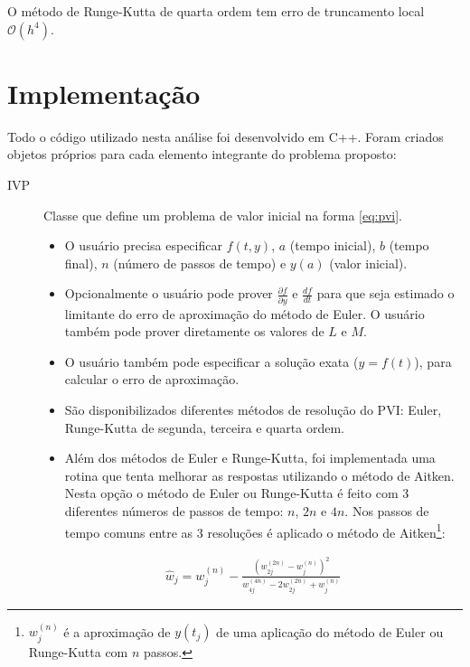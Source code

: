 \documentclass[final,5p]{elsarticle}
\numberwithin{equation}{section}
\begin{document}
        O método de Runge-Kutta de quarta ordem tem erro de truncamento local $\mathcal{O}(h^4)$.

\section{Implementação} \label{sec:implementacao}

        Todo o código utilizado nesta análise foi desenvolvido em C++. Foram criados objetos próprios para cada elemento integrante do problema proposto:

        \begin{description}
            \item[IVP] Classe que define um problema de valor inicial na forma \ref{eq:pvi}.
            \begin{itemize}
                \item O usuário precisa especificar $f(t,y)$, $a$ (tempo inicial), $b$ (tempo final), $n$ (número de passos de tempo) e $y(a)$ (valor inicial).
                \item Opcionalmente o usuário pode prover $\frac{\partial f}{\partial y}$ e $\frac{df}{dt}$ para que seja estimado o limitante do erro de aproximação do método de Euler. O usuário também pode prover diretamente os valores de $L$ e $M$.
                \item O usuário também pode especificar a solução exata ($y=f(t)$), para calcular o erro de aproximação.
                \item São disponibilizados diferentes métodos de resolução do PVI: Euler, Runge-Kutta de segunda, terceira e quarta ordem.
                \item Além dos métodos de Euler e Runge-Kutta, foi implementada uma rotina que tenta melhorar as respostas utilizando o método de Aitken. Nesta opção o método de Euler ou Runge-Kutta é feito com 3 diferentes números de passos de tempo: $n$, $2 n$ e $4 n$. Nos passos de tempo comuns entre as 3 resoluções é aplicado o método de Aitken\footnote{$w^{(n)}_j$ é a aproximação de $y(t_j)$ de uma aplicação do método de Euler ou Runge-Kutta com $n$ passos.}:
            \end{itemize}

                \begin{align}
                    \widehat{w}_j = w^{(n)}_j - \frac{\left(w^{(2n)}_{2j} - w^{(n)}_j\right) ^2}{w^{(4n)}_{4j}-2w^{(2n)}_{2j}+w^{(n)}_j} \label{eq:aitken}
                \end{align}



\end{description}
\end{document}
